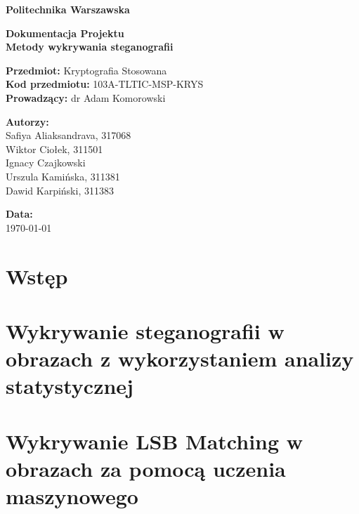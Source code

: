 \documentclass[a4paper,12pt]{article}
\begin{document}
\begin{titlepage}
	\begin{center}
		\vspace*{1cm}

		\textbf{\Huge Politechnika Warszawska}\\
		\vspace{2cm}

		\textbf{\LARGE Dokumentacja Projektu}\\
		\vspace{0.5cm}
		\textbf{\Large Metody wykrywania steganografii}\\

		\vspace{2cm}

		\textbf{Przedmiot:} Kryptografia Stosowana \\
		\textbf{Kod przedmiotu:} 103A-TLTIC-MSP-KRYS \\
		\textbf{Prowadzący:} dr Adam Komorowski \\

		\vfill

		\textbf{Autorzy:}\\
		\vspace{0.5cm}
		Safiya Aliaksandrava, 317068\\
		Wiktor Ciołek, 311501\\
		Ignacy Czajkowski\\
		Urszula Kamińska, 311381\\
		Dawid Karpiński, 311383\\

		\vspace{1cm}

		\textbf{Data:} \\
		\today

		\vspace{2cm}
	\end{center}
\end{titlepage}

\section{Wstęp}



\clearpage
\section{Wykrywanie steganografii w obrazach z wykorzystaniem analizy statystycznej}


\clearpage
\section{Wykrywanie LSB Matching w obrazach za pomocą uczenia maszynowego}

\end{document}
